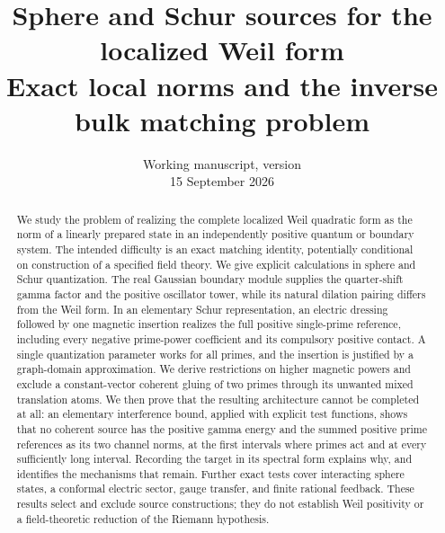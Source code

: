 \documentclass[11pt]{article}
\title{Sphere and Schur sources for the localized Weil form\\[5pt]
\large Exact local norms and the inverse bulk matching problem}
\author{}
\date{Working manuscript, version \draftversion\\15 September 2026}
\numberwithin{equation}{section}
\theoremstyle{definition}
\theoremstyle{remark}
\begin{document}
\maketitle
\begin{abstract}
We study the problem of realizing the complete localized Weil quadratic
form as the norm of a linearly prepared state in an independently positive
quantum or boundary system. The intended difficulty is an exact matching
identity, potentially conditional on construction of a specified field
theory. We give explicit calculations in sphere and Schur quantization.
The real Gaussian boundary module supplies the quarter-shift gamma factor
and the positive oscillator tower, while its natural dilation pairing
differs from the Weil form. In an elementary Schur representation, an
electric dressing followed by one magnetic insertion realizes the full
positive single-prime reference, including every negative prime-power
coefficient and its compulsory positive contact. A single quantization
parameter works for all primes, and the insertion is justified by a
graph-domain approximation. We derive restrictions on higher magnetic
powers and exclude a constant-vector coherent gluing of two primes through
its unwanted mixed translation atoms. We then prove that the resulting
architecture cannot be completed at all: an elementary interference bound,
applied with explicit test functions, shows that no coherent source has the
positive gamma energy and the summed positive prime references as its two
channel norms, at the first intervals where primes act and at every
sufficiently long interval. Recording the target in its spectral form
explains why, and identifies the mechanisms that remain. Further exact tests
cover interacting sphere states, a conformal electric sector, gauge transfer,
and finite rational feedback. These results select and exclude source
constructions; they do not establish Weil positivity or a field-theoretic
reduction of the Riemann hypothesis.
\end{abstract}

\clearpage
{\small\tableofcontents}
\clearpage







\appendix




\clearpage
{}
{}

\end{document}

